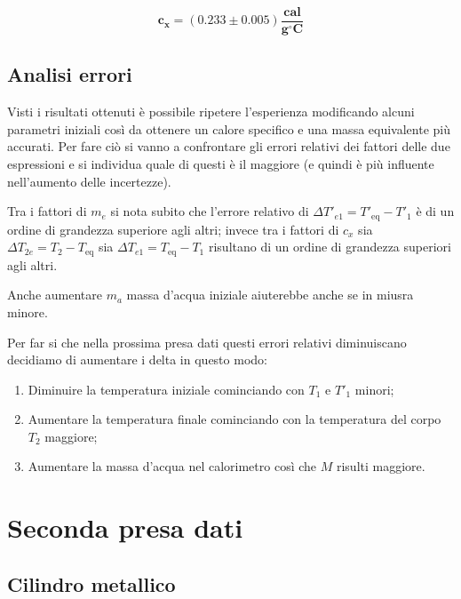 \documentclass{article}
\begin{document}
	\[ 
	\boxed{\boldsymbol{c_{x} = (0.233 \pm 0.005) \frac{\text{cal}}{g ^\circ C}}}
	\]
	
	\subsection{Analisi errori}
	Visti i risultati ottenuti è possibile ripetere l'esperienza modificando alcuni parametri iniziali così da ottenere un calore specifico e una massa equivalente più accurati. Per fare ciò si vanno a confrontare gli errori relativi dei fattori delle due espressioni e si individua quale di questi è il maggiore (e quindi è più influente nell'aumento delle incertezze).
	
	Tra i fattori di \(m_{e}\) si nota subito che l'errore relativo di \(\Delta T'_{e1} = T'_{\text{eq}} - T'_{1}\) è di un ordine di grandezza superiore agli altri; invece tra i fattori di \(c_{x}\) sia \(\Delta T_{2e}=T_{2} - T_{\text{eq}}\) sia \(\Delta T_{e1} = T_{\text{eq}} - T_{1}\) risultano di un ordine di grandezza superiori agli altri. 
	
	Anche aumentare \(m_{a}\) massa d'acqua iniziale aiuterebbe anche se in miusra minore.
	
	Per far si che nella prossima presa dati questi errori relativi diminuiscano decidiamo di aumentare i delta in questo modo:
	\begin{enumerate}
		\item Diminuire la temperatura iniziale cominciando con \(T_{1}\) e \(T'_{1}\) minori;
		\item Aumentare la temperatura finale cominciando con la temperatura del corpo \(T_{2}\) maggiore;
		\item Aumentare la massa d'acqua nel calorimetro così che \(M\) risulti maggiore.
	\end{enumerate}
	
	
	
	
	\newpage
	\section{Seconda presa dati}
	\subsection{Cilindro metallico}
	
\end{document}
